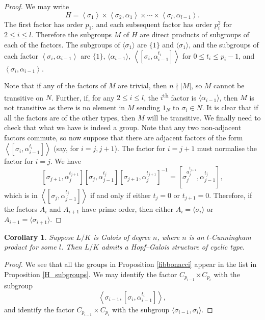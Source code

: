 \documentclass[a4paper,reqno]{amsart}
\newtheorem{corollary}[theorem]{Corollary}
\theoremstyle{definition}
\begin{document}
\begin{proof}
    We may write
    \[H=\left\langle \sigma_1 \right\rangle \times \left\langle \sigma_2,\alpha_1 \right\rangle \times \cdots \times \left\langle \sigma_l, \alpha_{l-1} \right\rangle.\]
    The first factor has order $p_1$, and each subsequent factor has order $p_i^2$ for $2\leq i \leq l$. Therefore the subgroups $M$ of $H$ are direct products of subgroups of each of the factors. The subgroups of $\langle \sigma_1 \rangle$ are $\{1\}$ and $\langle \sigma_1 \rangle$, and the subgroups of each factor $\left\langle \sigma_i,\alpha_{i-1} \right\rangle$ are $\{1\}$, $\langle \alpha_{i-1} \rangle$, $\left\langle \left[\sigma_i, \alpha_{i-1}^{t_i}\right] \right\rangle$ for $0 \leq t_i \leq p_i-1$, and $\left\langle \sigma_i,\alpha_{i-1} \right\rangle$.
	
    Note that if any of the factors of $M$ are trivial, then $n \nmid |M|$, so $M$ cannot be transitive on $N$. Further, if, for any $2 \leq i \leq l$, the $i$\textsuperscript{th} factor is $\langle \alpha_{i-1} \rangle$, then $M$ is not transitive as there is no element in $M$ sending $1_N$ to $\sigma_i \in N$. It is clear that if all the factors are of the other types, then $M$ will be transitive. We finally need to check that what we have is indeed a group. Note that any two non-adjacent factors commute, so now suppose that there are adjacent factors of the form $\left\langle\left[\sigma_i,\alpha_{i-1}^{t_i}\right]\right\rangle$ (say, for $i=j,j+1$). The factor for $i=j+1$ must normalise the factor for $i=j$. We have
    \[\left[\sigma_{j+1},\alpha_j^{t_{j+1}}\right]\left[\sigma_j,\alpha_{j-1}^{t_j}\right]\left[\sigma_{j+1},\alpha_j^{t_{j+1}}\right]^{-1}=\left[\sigma_j^{a_j^{t_{j+1}}},\alpha_{j-1}^{t_j}\right],\]
    which is in $\left\langle\left[\sigma_j,\alpha_{j-1}^{t_j}\right]\right\rangle$ if and only if either $t_j=0$ or $t_{j+1}=0$. Therefore, if the factors $A_i$ and $A_{i+1}$ have prime order, then either $A_i=\langle \sigma_i \rangle$ or $A_{i+1}=\langle \sigma_{i+1} \rangle$.
\end{proof}
\begin{corollary}
    Suppose $L/K$ is Galois of degree $n$, where $n$ is an $l$-Cunningham product for some $l$. Then $L/K$ admits a Hopf--Galois structure of cyclic type.
\end{corollary}
\begin{proof}
    We see that all the groups in Proposition \ref{fibbonacci} appear in the list in Proposition \ref{H_subgroups}. We may identify the factor $C_{p_{i-1}} \rtimes C_{p_i}$ with the subgroup
    \[\left\langle \sigma_{i-1}, \left[\sigma_i,\alpha_{i-1}^{t_i}\right] \right\rangle,\]
    and identify the factor $C_{p_{i-1}} \times C_{p_i}$ with the subgroup $\langle \sigma_{i-1}, \sigma_i \rangle$.
\end{proof}
\end{document}
